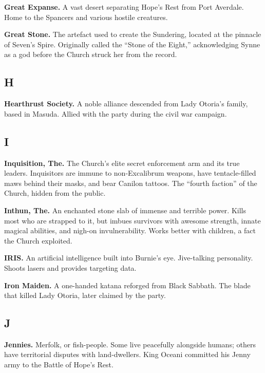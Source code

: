 \smallskip \noindent
\textbf{Great Expanse.} A vast desert separating Hope's Rest from Port Averdale. Home to the Spancers and various hostile creatures.

\smallskip \noindent
\textbf{Great Stone.} The artefact used to create the Sundering, located at the pinnacle of Seven's Spire. Originally called the ``Stone of the Eight,'' acknowledging Synne as a god before the Church struck her from the record.

\subsection*{H}

\noindent
\textbf{Hearthrust Society.} A noble alliance descended from Lady Otoria's family, based in Masuda. Allied with the party during the civil war campaign.

\subsection*{I}

\noindent
\textbf{Inquisition, The.} The Church's elite secret enforcement arm and its true leaders. Inquisitors are immune to non-Excalibrum weapons, have tentacle-filled maws behind their masks, and bear Canilon tattoos. The ``fourth faction'' of the Church, hidden from the public.

\smallskip \noindent
\textbf{Inthun, The.} An enchanted stone slab of immense and terrible power. Kills most who are strapped to it, but imbues survivors with awesome strength, innate magical abilities, and nigh-on invulnerability. Works better with children, a fact the Church exploited.

\smallskip \noindent
\textbf{IRIS.} An artificial intelligence built into Burnie's eye. Jive-talking personality. Shoots lasers and provides targeting data.

\smallskip \noindent
\textbf{Iron Maiden.} A one-handed katana reforged from Black Sabbath. The blade that killed Lady Otoria, later claimed by the party.

\subsection*{J}

\noindent
\textbf{Jennies.} Merfolk, or fish-people. Some live peacefully alongside humans; others have territorial disputes with land-dwellers. King Oceani committed his Jenny army to the Battle of Hope's Rest.

